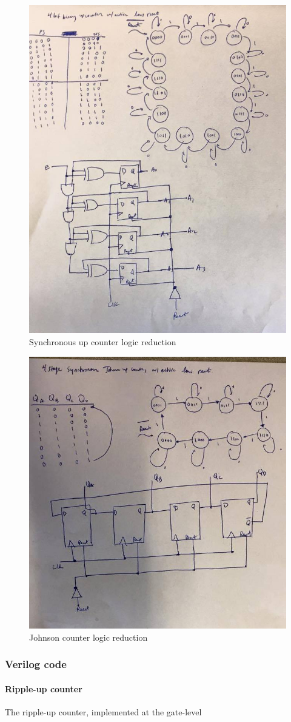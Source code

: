 \documentclass{article}
\begin{document}
		\begin{figure}[H]
			\centering
			\includegraphics[width=0.5\linewidth]{figures/gate_diagrams/synchUp_gate.jpg}
			\caption{Synchronous up counter logic reduction}
		\end{figure}

		\begin{figure}[H]
			\centering
			\includegraphics[width=0.5\linewidth]{figures/gate_diagrams/johnson_gate.jpg}
			\caption{Johnson counter logic reduction}
		\end{figure}


	\subsubsection{Verilog code}
		\paragraph{Ripple-up counter} The ripple-up counter, implemented at the gate-level
		
		
\end{document}
